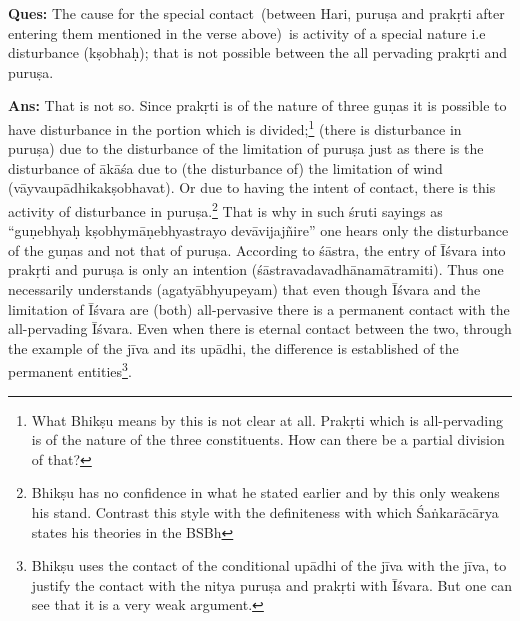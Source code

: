 \textbf{Ques:} The cause for the special contact (between Hari, puruṣa and prakṛti after entering them mentioned in the verse above) is activity of a special nature i.e disturbance (kṣobhaḥ); that is not possible between the all pervading prakṛti and puruṣa.

\textbf{Ans:} That is not so. Since prakṛti is of the nature of three guṇas it is possible to have disturbance in the portion which is divided;\footnote{What Bhikṣu means by this is not clear at all. Prakṛti which is all-pervading is of the nature of the three constituents. How can there be a partial division of that?} (there is disturbance in puruṣa) due to the disturbance of the limitation of puruṣa just as there is the disturbance of ākāśa due to (the disturbance of) the limitation of wind (vāyvaupādhikakṣobhavat). Or due to having the intent of contact, there is this activity of disturbance in puruṣa.\footnote{Bhikṣu has no confidence in what he stated earlier and by this only weakens his stand. Contrast this style with the definiteness with which Śaṅkarācārya states his theories in the BSBh} That is why in such śruti sayings as “guṇebhyaḥ kṣobhymāṇebhyastrayo devāvijajñire” one hears only the disturbance of the guṇas and not that of puruṣa.  According to śāstra, the entry of Īśvara into prakṛti and puruṣa is only an intention (śāstravadavadhānamātramiti). Thus one necessarily understands (agatyābhyupeyam) that even though Īśvara and the limitation of Īśvara are (both) all-pervasive there is a permanent contact with the all-pervading Īśvara. Even when there is eternal contact between the two, through the example of the jīva and its upādhi, the difference is established of the permanent entities\footnote{Bhikṣu uses the contact of the conditional upādhi of the jīva with the jīva, to justify the contact with the nitya puruṣa and prakṛti with Īśvara. But one can see that it is a very weak argument.}. 

